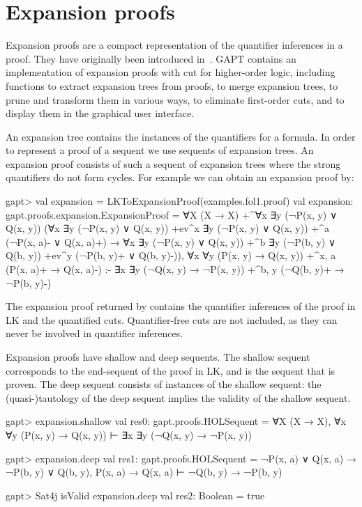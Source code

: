 \documentclass[a4paper,11pt]{book}
\newcommand{\cli}[1]{{\ttfamily {#1}}}
\begin{document}
\section{Expansion proofs}

Expansion proofs are a compact representation of the quantifier inferences in a
proof.  They have originally been introduced in~\cite{Miller87Compact}.  GAPT
contains an implementation of expansion proofs with cut for higher-order logic,
including functions to extract expansion trees from proofs, to merge expansion
trees, to prune and transform them in various ways, to eliminate first-order
cuts, and to display them in the graphical user interface.

An expansion tree contains the instances of the quantifiers for a formula.  In order
to represent a proof of a sequent we use sequents of expansion trees.  An
expansion proof consists of such a sequent of expansion trees where the
strong quantifiers do not form cycles.
For example we can obtain an expansion proof by:
\begin{clilisting}
  gapt> val expansion = LKToExpansionProof(examples.fol1.proof)
  val expansion: gapt.proofs.expansion.ExpansionProof = ∀X (X → X)
  +^{∀x ∃y (¬P(x, y) ∨ Q(x, y))}
  (∀x ∃y (¬P(x, y) ∨ Q(x, y)) +ev^{x}
  ∃y (¬P(x, y) ∨ Q(x, y))
  +^{a} (¬P(x, a)- ∨ Q(x, a)+) →
  ∀x ∃y (¬P(x, y) ∨ Q(x, y))
  +^{b} ∃y (¬P(b, y) ∨ Q(b, y)) +ev^{y} (¬P(b, y)+ ∨ Q(b, y)-)),
  ∀x ∀y (P(x, y) → Q(x, y)) +^{x, a} (P(x, a)+ → Q(x, a)-)
  :-
  ∃x ∃y (¬Q(x, y) → ¬P(x, y)) +^{b, y} (¬Q(b, y)+ → ¬P(b, y)-)

\end{clilisting}

The expansion proof returned by \cli{LKToExpansionProof} contains the
quantifier inferences of the proof in LK and the quantified cuts.
Quantifier-free cuts are not included, as they can never be involved in
quantifier inferences.

Expansion proofs have shallow and deep sequents.  The shallow sequent
corresponds to the end-sequent of the proof in LK, and is the sequent that is
proven.  The deep sequent consists of instances of the shallow sequent: the
(quasi-)tautology of the deep sequent implies the validity of the shallow
sequent.
\begin{clilisting}
  gapt> expansion.shallow
  val res0: gapt.proofs.HOLSequent = ∀X (X → X), ∀x ∀y (P(x, y) → Q(x, y)) ⊢ ∃x ∃y (¬Q(x, y) → ¬P(x, y))

  gapt> expansion.deep
  val res1: gapt.proofs.HOLSequent = ¬P(x, a) ∨ Q(x, a) → ¬P(b, y) ∨ Q(b, y), P(x, a) → Q(x, a) ⊢ ¬Q(b, y) → ¬P(b, y)

  gapt> Sat4j isValid expansion.deep
  val res2: Boolean = true

\end{clilisting}
\end{document}
